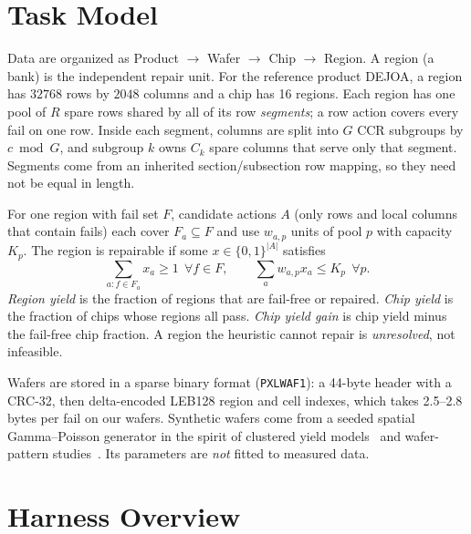 \documentclass[conference]{IEEEtran}
\newcommand{\code}[1]{\texttt{\small #1}}
\begin{document}
\section{Task Model}
\label{sec:problem}

Data are organized as Product $\rightarrow$ Wafer $\rightarrow$ Chip
$\rightarrow$ Region. A region (a bank) is the independent repair unit. For
the reference product DEJOA, a region has $32768$ rows by $2048$ columns and
a chip has 16 regions. Each region has one pool of $R$ spare rows shared by
all of its row \emph{segments}; a row action covers every fail on one row.
Inside each segment, columns are split into $G$ CCR subgroups by
$c \bmod G$, and subgroup $k$ owns $C_k$ spare columns that serve only that
segment. Segments come from an inherited section/subsection row mapping, so
they need not be equal in length.

For one region with fail set $F$, candidate actions $A$ (only rows and local
columns that contain fails) each cover $F_a\subseteq F$ and use $w_{a,p}$
units of pool $p$ with capacity $K_p$. The region is repairable if some
$x\in\{0,1\}^{|A|}$ satisfies
\begin{equation}
\sum_{a: f\in F_a} x_a \ge 1\ \ \forall f\in F,\qquad
\sum_a w_{a,p}x_a \le K_p\ \ \forall p. \label{eq:model}
\end{equation}
\emph{Region yield} is the fraction of regions that are fail-free or
repaired. \emph{Chip yield} is the fraction of chips whose regions all pass.
\emph{Chip yield gain} is chip yield minus the fail-free chip fraction. A
region the heuristic cannot repair is \emph{unresolved}, not infeasible.

Wafers are stored in a sparse binary format (\code{PXLWAF1}): a 44-byte
header with a CRC-32, then delta-encoded LEB128 region and cell indexes,
which takes 2.5--2.8 bytes per fail on our wafers. Synthetic wafers come from
a seeded spatial Gamma--Poisson generator in the spirit of clustered yield
models~\cite{stapper1986,bae2007} and wafer-pattern studies~\cite{wu2015}.
Its parameters are \emph{not} fitted to measured data.

\section{Harness Overview}
\label{sec:overview}
\end{document}
